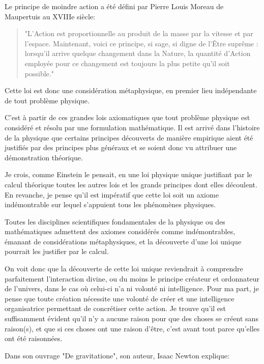 Le principe de moindre action a été défini par Pierre Louis Moreau de Maupertuis au XVIIIe siècle:

\begin{center}
\begin{quote}
"L’Action est proportionnelle au produit de la masse par la vitesse et par l’espace. Maintenant, voici ce principe, si sage, si digne de l’Être suprême : lorsqu’il arrive quelque changement dans la Nature, la quantité d’Action employée pour ce changement est toujours la plus petite qu’il soit possible."
\end{quote}

\end{center}

Cette loi est donc une considération métaphysique, en premier lieu indépendante de tout problème physique.

C’est à partir de ces grandes lois axiomatiques que tout problème physique est considéré et résolu par une formulation mathématique. Il est arrivé dans l’histoire de la physique que certains principes découverts de manière empirique aient été justifiés par des principes plus généraux et se soient donc vu attribuer une démonstration théorique.

Je crois, comme Einstein le pensait, en une loi physique unique justifiant par le calcul théorique toutes les autres lois et les grands principes dont elles découlent. En revanche, je pense qu’il est impératif que cette loi soit un axiome indémontrable sur lequel s'appuient tous les phénomènes physiques.

Toutes les disciplines scientifiques fondamentales de la physique ou des mathématiques admettent des axiomes considérés comme indémontrables, émanant de considérations métaphysiques, et la découverte d’une loi unique pourrait les justifier par le calcul.

On voit donc que la découverte de cette loi unique reviendrait à comprendre parfaitement l’interaction divine, ou du moins le principe créateur et ordonnateur de l’univers, dans le cas où celui-ci n’a ni volonté ni intelligence. Pour ma part, je pense que toute création nécessite une volonté de créer et une intelligence organisatrice permettant de concrétiser cette action. Je trouve qu’il est suffisamment évident qu’il n’y a aucune raison pour que des choses se créent sans raison(s), et que si ces choses ont une raison d’être, c’est avant tout parce qu’elles ont été raisonnées.

Dans son ouvrage "De gravitatione", son auteur, Isaac Newton explique: 

